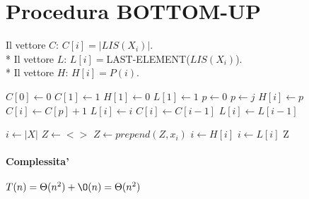 \newpage

\section{Procedura BOTTOM-UP}

Il vettore $C$: $C[i] = |LIS(X_i)|$. \\*
Il vettore $L$: $L[i] = $LAST-ELEMENT($LIS(X_{i})$). \\*
Il vettore $H$: $H[i] = P(i)$. \\

\begin{algorithm}
    \begin{algorithmic}
            \State $C[0] \gets 0$
            \State $C[1] \gets 1$
            \State $H[1] \gets 0$
            \State $L[1] \gets 1$
                \State $p \gets 0$
                        \State $p \gets j$
                    \EndIf
                \EndFor
                \State $H[i] \gets p$
                    \State $C[i] \gets C[p] + 1$
                    \State $L[i] \gets i$
                \Else
                    \State $C[i] \gets C[i-1]$
                    \State $L[i] \gets L[i-1]$
                \EndIf
            \EndFor
        \EndProcedure
    \end{algorithmic}
\end{algorithm}

\begin{algorithm}
    \begin{algorithmic}
            \State $i \gets |X|$
            \State $Z \gets <>$
                    \State $Z \gets prepend(Z, x_i)$
                    \State $i \gets H[i]$
                \Else
                    \State $i \gets L[i]$
                \EndIf
            \EndWhile
            \State \Return Z
        \EndProcedure
    \end{algorithmic}
\end{algorithm}

\paragraph{Complessita'}
$T(n) = \Theta(n^2) + \O(n) = \Theta(n^2)$

\newpage

